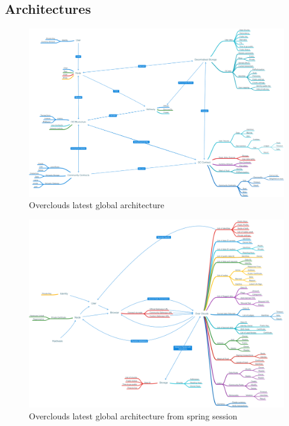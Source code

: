 
\subsection{Architectures}

\begin{figure}[htpb]
\centering
\begin{adjustbox}{center}
\includegraphics[scale=0.21]{annexes/architecture/oc-architecture-latest.png}
\end{adjustbox}
\caption{Overclouds latest global architecture
\label{fig:latest-architecture}}  
\end{figure}

\begin{figure}[htpb]
\centering
\begin{adjustbox}{center}
\includegraphics[scale=0.21]{annexes/architecture/oc-architecture-ss-latest.png}
\end{adjustbox}
\caption{Overclouds latest global architecture from spring session
\label{fig:latest-ss-architecture}}  
\end{figure}


